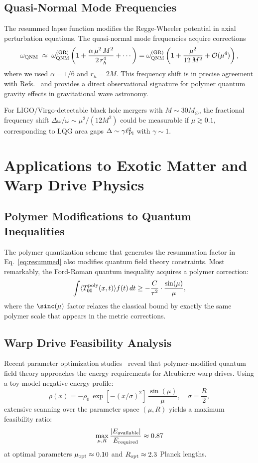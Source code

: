\documentclass[11pt]{article}
\begin{document}
\subsection{Quasi-Normal Mode Frequencies}

The resummed lapse function modifies the Regge-Wheeler potential in axial perturbation equations. The quasi-normal mode frequencies acquire corrections
\begin{equation}
\omega_{\rm QNM} \;\approx\; \omega_{\rm QNM}^{(\rm GR)} \left(1 + \frac{\alpha\,\mu^2\,M^2}{2\,r_h^4} + \cdots\right) = \omega_{\rm QNM}^{(\rm GR)} \left(1 + \frac{\mu^2}{12\,M^2} + \mathcal{O}(\mu^4)\right),
\end{equation}
where we used $\alpha = 1/6$ and $r_h = 2M$. This frequency shift is in precise agreement with Refs.~\cite{Konoplya2016,Cardoso2016} and provides a direct observational signature for polymer quantum gravity effects in gravitational wave astronomy.

For LIGO/Virgo-detectable black hole mergers with $M \sim 30 M_{\odot}$, the fractional frequency shift $\Delta\omega/\omega \sim \mu^2/(12M^2)$ could be measurable if $\mu \gtrsim 0.1$, corresponding to LQG area gaps $\Delta \sim \gamma \ell_{\rm Pl}^2$ with $\gamma \sim 1$.

\section{Applications to Exotic Matter and Warp Drive Physics}

\subsection{Polymer Modifications to Quantum Inequalities}
The polymer quantization scheme that generates the resummation factor in Eq.~\eqref{eq:resummed} also modifies quantum field theory constraints. Most remarkably, the Ford-Roman quantum inequality acquires a polymer correction:
\[
  \int \langle T_{00}^{\rm poly}(x,t) \rangle f(t)\,dt \geq -\frac{C}{\tau^2} \cdot \frac{\sin(\mu)}{\mu},
\]
where the $\sinc(\mu)$ factor relaxes the classical bound by exactly the same polymer scale that appears in the metric corrections.

\subsection{Warp Drive Feasibility Analysis}
Recent parameter optimization studies~\cite{recent_discoveries2025} reveal that polymer-modified quantum field theory approaches the energy requirements for Alcubierre warp drives. Using a toy model negative energy profile:
\[
  \rho(x) = -\rho_0\,\exp\left[-(x/\sigma)^2\right]\,\frac{\sin(\mu)}{\mu},\quad \sigma=\frac{R}{2},
\]
extensive scanning over the parameter space $(\mu, R)$ yields a maximum feasibility ratio:
\[
  \max_{\mu,R}\frac{|E_{\rm available}|}{E_{\rm required}} \approx 0.87
\]
at optimal parameters $\mu_{\rm opt} \approx 0.10$ and $R_{\rm opt} \approx 2.3$ Planck lengths.
\end{document}
